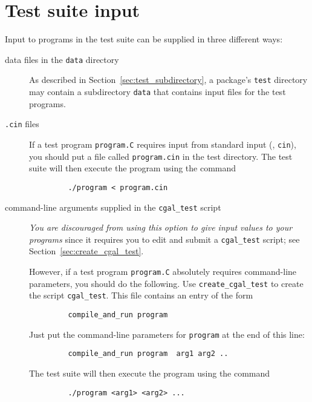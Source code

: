 \section{Test suite input}
\label{sec:test_suite_input}

Input to programs in the test suite can be supplied in three different
ways:
\begin{description}
   \item[data files in the {\tt data} directory]
         As described in Section~\ref{sec:test_subdirectory}, a package's
         {\tt test} directory may contain a subdirectory {\tt data} that
         contains input files for the test programs.
   \item[{\tt *.cin} files]
         If a test program \texttt{program.C} requires input from standard 
         input (\ie, {\tt cin}), you should put a file called 
         \texttt{program.cin} in the test directory. 
         The test suite will then execute the program using the command
         \begin{verbatim}
         ./program < program.cin
         \end{verbatim}
   \item[command-line arguments supplied in the {\tt cgal\_test} script]
        {\em You are discouraged from using this option to give input values
        to your programs} since it requires you to edit and submit a 
        {\tt cgal\_test} script; see Section~\ref{sec:create_cgal_test}.

         However, if a test program \texttt{program.C} absolutely requires 
         command-line parameters, you should do the following. Use
         \texttt{create\_cgal\_test} to create the script \texttt{cgal\_test}.
         This file contains an entry of the form 
         \begin{verbatim}
         compile_and_run program 
         \end{verbatim}
         Just put the command-line 
         parameters for \texttt{program} at the end of this line: 
         \begin{verbatim}
         compile_and_run program  arg1 arg2 ..
         \end{verbatim}
         The test suite will then execute the program using the command

         \begin{verbatim}
         ./program <arg1> <arg2> ...
         \end{verbatim}
\end{description}



